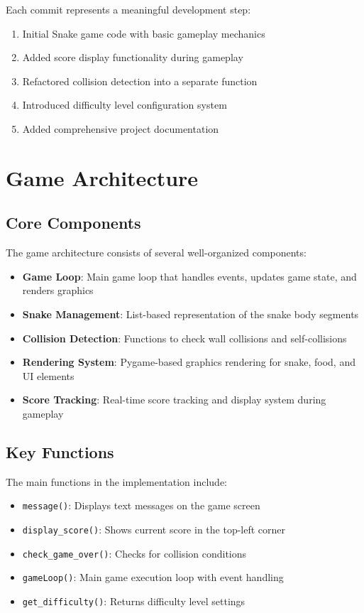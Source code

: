 \documentclass[12pt,a4paper]{article}
\begin{document}
Each commit represents a meaningful development step:
\begin{enumerate}
    \item Initial Snake game code with basic gameplay mechanics
    \item Added score display functionality during gameplay
    \item Refactored collision detection into a separate function
    \item Introduced difficulty level configuration system
    \item Added comprehensive project documentation
\end{enumerate}

\section{Game Architecture}

\subsection{Core Components}
The game architecture consists of several well-organized components:

\begin{itemize}
    \item \textbf{Game Loop}: Main game loop that handles events, updates game state, and renders graphics
    \item \textbf{Snake Management}: List-based representation of the snake body segments
    \item \textbf{Collision Detection}: Functions to check wall collisions and self-collisions
    \item \textbf{Rendering System}: Pygame-based graphics rendering for snake, food, and UI elements
    \item \textbf{Score Tracking}: Real-time score tracking and display system during gameplay
\end{itemize}

\subsection{Key Functions}
The main functions in the implementation include:

\begin{itemize}
    \item \texttt{message()}: Displays text messages on the game screen
    \item \texttt{display\_score()}: Shows current score in the top-left corner
    \item \texttt{check\_game\_over()}: Checks for collision conditions
    \item \texttt{gameLoop()}: Main game execution loop with event handling
    \item \texttt{get\_difficulty()}: Returns difficulty level settings
\end{itemize}
\end{document}
